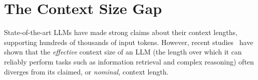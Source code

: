 \section{The Context Size Gap}




State-of-the-art LLMs have made strong claims about their context lengths, supporting hundreds of thousands of input tokens. However, recent studies~\cite{prolong,yen2024helmet,shang2024ai} have shown that the \emph{effective} context size of an LLM (the length over which it can reliably perform tasks such as information retrieval and complex reasoning) often diverges from its claimed, or \emph{nominal}, context length. 

